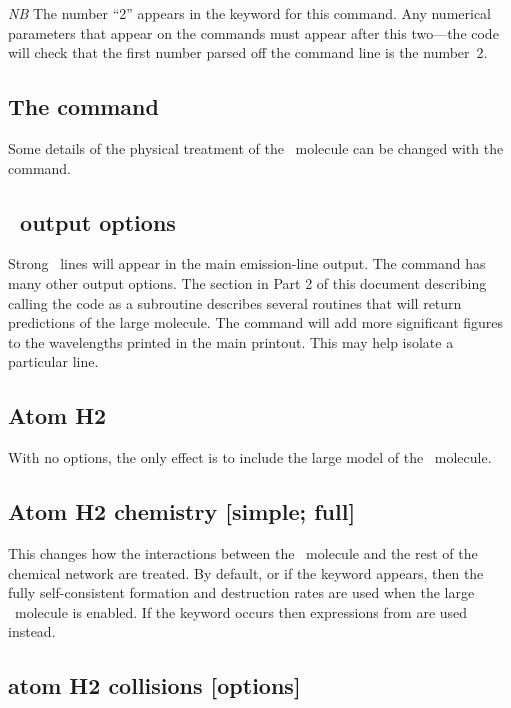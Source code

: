 \emph{NB}  The number ``2'' appears in the keyword for this command.
Any
numerical parameters that appear on the 
commands must appear after
this two---the code will check that the first number
parsed off the command line is the number~2.

\subsection{The  command}

Some details of the physical treatment of the \htwo\ molecule can be
changed with the  command.

\subsection{\htwo\ output options}

Strong \htwo\ lines will appear in the main emission-line output.
The  command has many other output options.
The
section in Part 2 of this document describing calling the code as a
subroutine describes several routines that will return predictions of the
large molecule.
The  command
will add more significant figures to the wavelengths printed in the main
printout.
This may help isolate a particular line.

\subsection{Atom H2}

With no options, the only effect is to include the large model of the
\htwo\ molecule.

\subsection{Atom H2 chemistry [simple; full]}

This changes how the interactions between the \htwo\ molecule
and the rest of the chemical network are treated.
By default, or if the keyword
appears, then the fully self-consistent formation and destruction rates
are used when the large \htwo\ molecule is enabled.
If the keyword
 occurs
then expressions from \citet{Tielens1985a} are used instead.

\subsection{atom H2 collisions [options]}

